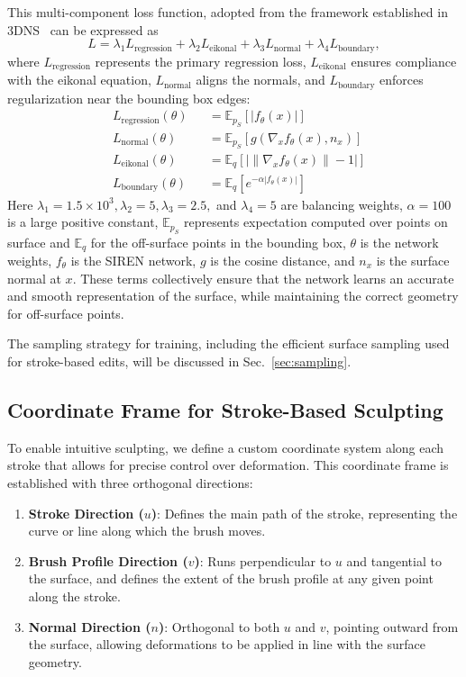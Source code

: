 This multi-component loss function, adopted from the framework established in 3DNS~\cite{tzathas20233d} can be expressed as
\begin{equation}
L = \lambda_1 L_{\text{regression}} + \lambda_2 L_{\text{eikonal}} + \lambda_3 L_{\text{normal}} + \lambda_4 L_{\text{boundary}},
\end{equation}
where \(L_{\text{regression}}\) represents the primary regression loss, \(L_{\text{eikonal}}\) ensures compliance with the eikonal equation, \(L_{\text{normal}}\) aligns the normals, and \(L_{\text{boundary}}\) enforces regularization near the bounding box edges:
\begin{align}
&L_\text{regression}(\theta) &&= \mathbb{E}_{p_S} \left[|f_\theta(x)|\right]\\
 & L_\text{normal}(\theta) &&= \mathbb{E}_{p_S} \left[g(\nabla_x f_\theta(x), n_x)\right]\\
  &  L_{\text{eikonal}}(\theta) &&= \mathbb{E}_q \left[\left| \|\nabla_x f_\theta(x)\| - 1 \right| \right]\\
   & L_{\text{boundary}}(\theta) &&= \mathbb{E}_q \left[ e^{-\alpha |f_\theta(x)|} \right]
\end{align}
Here \( \lambda_1=1.5\times 10^3, \lambda_2=5, \lambda_3=2.5, \) and \( \lambda_4=5 \) are balancing weights, \( \alpha=100 \) is a large positive constant, $\mathbb{E}_{p_S}$ represents expectation computed over points on surface and $\mathbb{E}_{q}$ for the off-surface points in the bounding box, $\theta$ is the network weights, $f_\theta$ is the SIREN network, $g$ is the cosine distance, and $n_x$ is the surface normal at $x$.  These terms collectively ensure that the network learns an accurate and smooth representation of the surface, while maintaining the correct geometry for off-surface points.


The sampling strategy for training, including the efficient surface sampling used for stroke-based edits, will be discussed in Sec.~\ref{sec:sampling}. 
\subsection{Coordinate Frame for Stroke-Based Sculpting}
To enable intuitive sculpting, we define a custom coordinate system along each stroke that allows for precise control over deformation. This coordinate frame is established with three orthogonal directions:
\begin{enumerate}
    \item \textbf{Stroke Direction (\(u\))}: Defines the main path of the stroke, representing the curve or line along which the brush moves. 
   \item  \textbf{Brush Profile Direction (\(v\))}: Runs perpendicular to \(u\) and tangential to the surface, and defines the extent of the brush profile at any given point along the stroke.
   \item  \textbf{Normal Direction (\(n\))}: Orthogonal to both \(u\) and \(v\), pointing outward from the surface, allowing deformations to be applied in line with the surface geometry.
\end{enumerate}


